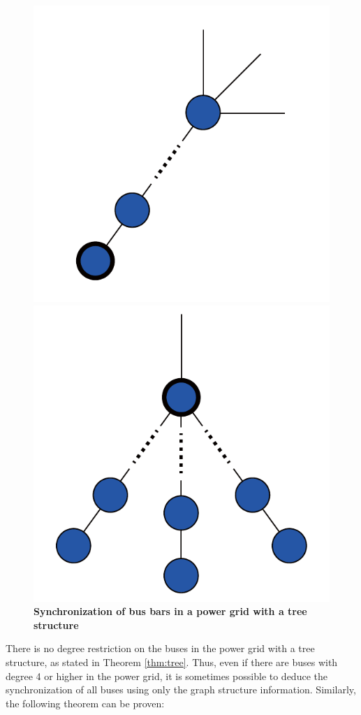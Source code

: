 \documentclass[graybox, envcountchap]{svmult}
\begin{document}
\begin{figure}[t]
  \centering
  {
  \begin{minipage}{0.40\linewidth}
    \centering
    \includegraphics[width = .50\linewidth]{figs/treesub}
    \subcaption{ }
  \end{minipage}
  \begin{minipage}{0.40\linewidth}
    \centering
    \includegraphics[width = .50\linewidth]{figs/tree}
    \subcaption{ }
  \end{minipage}
  \medskip
  \caption{\centering\textbf{Synchronization of bus bars in a power grid with a
  tree structure}}
  \label{fig:treepr}
  }
\medskip
\end{figure}
There is no degree restriction on the buses in the power grid with a tree
structure, as stated in Theorem \ref{thm:tree}. Thus, even if there are buses
with degree 4 or higher in the power grid, it is sometimes possible to deduce
the synchronization of all buses using only the graph structure information.
Similarly, the following theorem can be proven:
\end{document}
